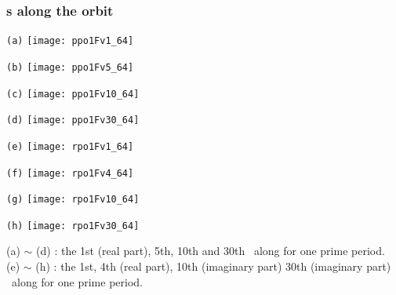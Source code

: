 \begin{frame}[shrink]%
  \frametitle{\Fv s  along the orbit}
 
  {\centering
    \begin{minipage}{.115\textwidth}
      \centering \small{\texttt{(a)}}
      \texttt{[image: ppo1Fv1\_64]}
    \end{minipage}
    \begin{minipage}{.115\textwidth}
      \centering \small{\texttt{(b)}}
      \texttt{[image: ppo1Fv5\_64]}
    \end{minipage}
    \begin{minipage}{.115\textwidth}
      \centering \small{\texttt{(c)}}
      \texttt{[image: ppo1Fv10\_64]}
    \end{minipage}
    \begin{minipage}{.115\textwidth}
      \centering \small{\texttt{(d)}}
      \texttt{[image: ppo1Fv30\_64]}
    \end{minipage}
    \begin{minipage}{.115\textwidth}
      \centering \small{\texttt{(e)}}
      \texttt{[image: rpo1Fv1\_64]}
    \end{minipage}
    \begin{minipage}{.115\textwidth}
      \centering \small{\texttt{(f)}}
      \texttt{[image: rpo1Fv4\_64]}
    \end{minipage}
    \begin{minipage}{.115\textwidth}
      \centering \small{\texttt{(g)}}
      \texttt{[image: rpo1Fv10\_64]}
    \end{minipage}
    \begin{minipage}{.115\textwidth}
      \centering \small{\texttt{(h)}}
      \texttt{[image: rpo1Fv30\_64]}
    \end{minipage}
    \par}
  {\scriptsize \centering
    (a) $\sim$ (d) : the 1st (real part), 5th, 10th and 30th \Fv\ along
     for one prime period.
    (e) $\sim$ (h) : the 1st, 4th (real part), 10th (imaginary part) 30th (imaginary part)
    \Fv\ along  for one prime period.
  }

\end{frame}

  
